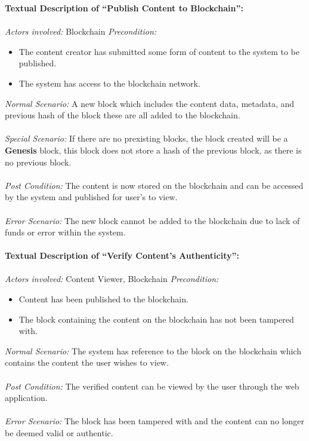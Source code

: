\newpage
\noindent
\textbf{Textual Description of “Publish Content to Blockchain”:} \\ \\
\textit{Actors involved:} Blockchain 
\textit{Precondition:} 
	\begin{itemize}
		\item The content creator has submitted some form of content to the system to be published.
		\item The system has access to the blockchain network. 
	\end{itemize}
\textit{Normal Scenario:} A new block which includes the content data, metadata, and previous hash of the block
						  these are all added to the blockchain. \\ \\
\textit{Special Scenario:} If there are no prexisting blocks, the block created will be a \textbf{Genesis} block,
						   this block does not store a hash of the previous block, as there is no previous block. \\ \\
\textit{Post Condition:} The content is now stored on the blockchain and can be accessed by the system 
						 and published for user’s to view. \\ \\
\textit{Error Scenario:} The new block cannot be added to the blockchain due to lack of funds 
						 or error within the system. \\ \\

\noindent
\textbf{Textual Description of “Verify Content's Authenticity”:} \\ \\
\textit{Actors involved:} Content Viewer, Blockchain 
\textit{Precondition:} 
	\begin{itemize}
		\item Content has been published to the blockchain.
		\item The block containing the content on the blockchain has not been tampered with.
	\end{itemize}
\textit{Normal Scenario:} The system has reference to the block on the blockchain which 
						  contains the content the user wishes to view. \\ \\
\textit{Post Condition:} The verified content can be viewed by the user through the web application. \\ \\
\textit{Error Scenario:} The block has been tampered with and the content can no longer be deemed valid or authentic. \\ \\

